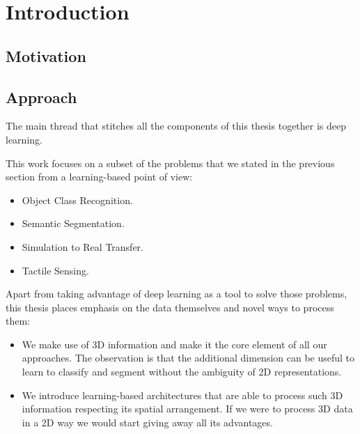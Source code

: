 \chapter{Introduction}
\label{cha:introduction}

\begin{chapterabstract}

\end{chapterabstract}

\minitoc

\clearpage

\section{Motivation}
\label{cha:introduction:sec:motivation}

\section{Approach}
\label{cha:introduction:sec:approach}

The main thread that stitches all the components of this thesis together is deep learning.

This work focuses on a subset of the problems that we stated in the previous section from a learning-based point of view:

\begin{itemize}
    \item Object Class Recognition.
    \item Semantic Segmentation.
    \item Simulation to Real Transfer.
    \item Tactile Sensing.
\end{itemize}

Apart from taking advantage of deep learning as a tool to solve those problems, this thesis places emphasis on the data themselves and novel ways to process them:

\begin{itemize}
    \item We make use of \ac{3D} information and make it the core element of all our approaches. The observation is that the additional dimension can be useful to learn to classify and segment without the ambiguity of \ac{2D} representations.
    \item We introduce learning-based architectures that are able to process such \ac{3D} information respecting its spatial arrangement. If we were to process \ac{3D} data in a \ac{2D} way we would start giving away all its advantages.
\end{itemize}

